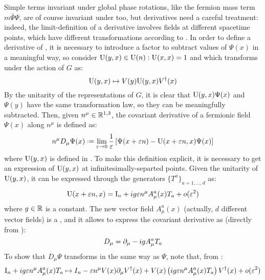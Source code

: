 Simple terms invariant under global phase rotations, like the fermion mass term $ m \bar{\Psi} \Psi $, are of course invariant under  too, but derivatives need a careful treatment: indeed, the limit-definition of a derivative involves fields at different spacetime points, which have different transformations according to . In order to define a derivative of \Psi, it is necessary to introduce a factor to subtract values of $ \Psi(x) $ in a meaningful way, so consider $ \mathrm{U}(y,x) \in \mathrm{U}(n) : \mathrm{U}(x,x) = 1 $ and which transforms under the action of $ G $ as:
\begin{equation}
  \mathrm{U}(y,x) \mapsto V(y) \mathrm{U}(y,x) V^\dagger(x)
  \label{eq:fac-cov-der}
\end{equation}
By the unitarity of the representations of $ G $, it is clear that $ \mathrm{U}(y,x) \Psi(x) $ and $ \Psi(y) $ have the same transformation law, so they can be meaningfully subtracted. Then, given $ n^\mu \in \mathbb{R}^{1,3} $, the covariant derivative of a fermionic field $ \Psi(x) $ along $ n^\mu $ is defined as:
\begin{equation}
  n^\mu D_\mu \Psi(x) \defeq \lim_{\varepsilon \rightarrow 0} \frac{1}{\varepsilon} \left[ \Psi(x + \varepsilon n) - \tens{U}(x + \varepsilon n, x) \Psi(x) \right]
  \label{eq:cov-der-def}
\end{equation}
where $ \mathrm{U}(y,x) $ is defined in . To make this definition explicit, it is necessary to get an expression of $ \mathrm{U}(y,x) $ at infinitesimally-separted points. Given the unitarity of $ \mathrm{U}(y,x) $, it can be expressed through the generators $ \{T^a\}_{a = 1, \dots, d} $ as:
\begin{equation}
  \mathrm{U}(x + \varepsilon n, x) = \mathrm{I}_n + i g \varepsilon n^\mu A_\mu^a(x) T_a + o(\varepsilon^2)
  \label{eq:fac-cov-der-exp}
\end{equation}
where $ g \in \mathbb{R} $ is a constant. The new vector field $ A_\mu^a(x) $ (actually, $ d $ different vector fields) is a , and it allows to express the covariant derivative as (directly from ):
\begin{equation}
  D_\mu = \partial_\mu - i g A_\mu^a T_a
\end{equation}
To show that $ D_\mu \Psi $ transforms in the same way as $ \Psi $, note that, from :
\begin{equation*}
  \mathrm{I}_n + i g \varepsilon n^\mu A_\mu^a(x) T_a \mapsto I_n - \varepsilon n^\mu V(x) \partial_\mu V^\dagger(x) + V(x) \left( i g \varepsilon n^\mu A_\mu^a(x) T_a \right) V^\dagger(x) + o(\varepsilon^2)
\end{equation*}
